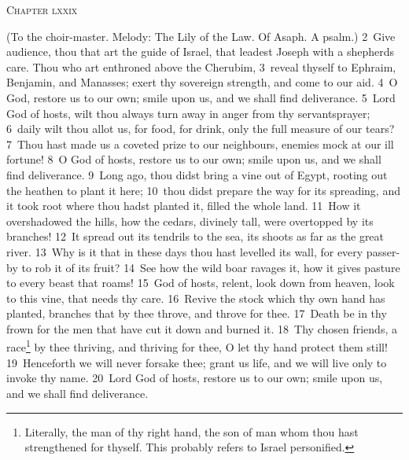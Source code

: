 \documentclass[10pt]{book} %
\begin{document}
\begin{large}\begin{center}\textsc{Chapter lxxix}\end{center}\end{large}
(To the choir-master. Melody: The Lily of the Law. Of Asaph. A psalm.)
\textcolor{benred8}{2}~Give audience, thou that art the guide of Israel, that leadest Joseph with a shepherd\textquotesingle s care. Thou who art enthroned above the Cherubim, \textcolor{benred8}{3}~reveal thyself to Ephraim, Benjamin, and Manasses; exert thy sovereign strength, and come to our aid. \textcolor{benred8}{4}~O God, restore us to our own; smile upon us, and we shall find deliverance. \textcolor{benred8}{5}~Lord God of hosts, wilt thou always turn away in anger from thy servants\textquotesingle  prayer; \textcolor{benred8}{6}~daily wilt thou allot us, for food, for drink, only the full measure of our tears? \textcolor{benred8}{7}~Thou hast made us a coveted prize to our neighbours, enemies mock at our ill fortune! \textcolor{benred8}{8}~O God of hosts, restore us to our own; smile upon us, and we shall find deliverance. \textcolor{benred8}{9}~Long ago, thou didst bring a vine out of Egypt, rooting out the heathen to plant it here; \textcolor{benred8}{10}~thou didst prepare the way for its spreading, and it took root where thou hadst planted it, filled the whole land. \textcolor{benred8}{11}~How it overshadowed the hills, how the cedars, divinely tall, were overtopped by its branches! \textcolor{benred8}{12}~It spread out its tendrils to the sea, its shoots as far as the great river. \textcolor{benred8}{13}~Why is it that in these days thou hast levelled its wall, for every passer-by to rob it of its fruit? \textcolor{benred8}{14}~See how the wild boar ravages it, how it gives pasture to every beast that roams! \textcolor{benred8}{15}~God of hosts, relent, look down from heaven, look to this vine, that needs thy care. \textcolor{benred8}{16}~Revive the stock which thy own hand has planted, branches that by thee throve, and throve for thee. \textcolor{benred8}{17}~Death be in thy frown for the men that have cut it down and burned it. \textcolor{benred8}{18}~Thy chosen friends, a race\footnote[1]{Literally, \textasciigrave the man of thy right hand, the son of man whom thou hast strengthened for thyself\textquotesingle . This probably refers to Israel personified.} by thee thriving, and thriving for thee, O let thy hand protect them still! \textcolor{benred8}{19}~Henceforth we will never forsake thee; grant us life, and we will live only to invoke thy name. \textcolor{benred8}{20}~Lord God of hosts, restore us to our own; smile upon us, and we shall find deliverance.
\end{document}
